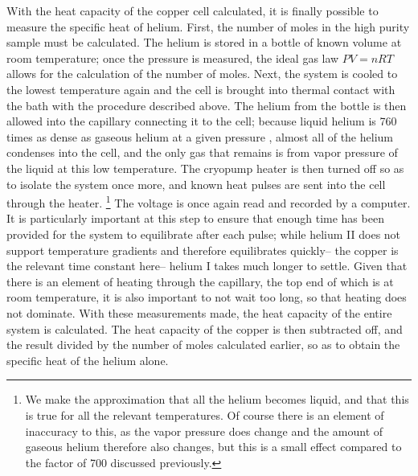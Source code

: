 With the heat capacity of the copper cell calculated, it is finally possible to measure the specific heat of helium. First, the number of moles in the high purity sample must be calculated. The helium is stored in a bottle of known volume at room temperature; once the pressure is measured, the ideal gas law $P V = n R T$ allows for the calculation of the number of moles. Next, the system is cooled to the lowest temperature again and the cell is brought into thermal contact with the bath with the procedure described above. The helium from the bottle is then allowed into the capillary connecting it to the cell; because liquid helium is 760 times as dense as gaseous helium at a given pressure \cite[p.~28]{shi}, almost all of the helium condenses into the cell, and the only gas that remains is from vapor pressure of the liquid at this low temperature. The cryopump heater is then turned off so as to isolate the system once more, and known heat pulses are sent into the cell through the heater. \footnote{We make the approximation that all the helium becomes liquid, and that this is true for all the relevant temperatures. Of course there is an element of inaccuracy to this, as the vapor pressure does change and the amount of gaseous helium therefore also changes, but this is a small effect compared to the factor of 700 discussed previously.} The voltage is once again read and recorded by a computer. It is particularly important at this step to ensure that enough time has been provided for the system to equilibrate after each pulse; while helium II does not support temperature gradients and therefore equilibrates quickly-- the copper is the relevant time constant here-- helium I takes much longer to settle. Given that there is an element of heating through the capillary, the top end of which is at room temperature, it is also important to not wait too long, so that heating does not dominate.  With these measurements made, the heat capacity of the entire system is calculated. The heat capacity of the copper is then subtracted off, and the result divided by the number of moles calculated earlier, so as to obtain the specific heat of the helium alone.